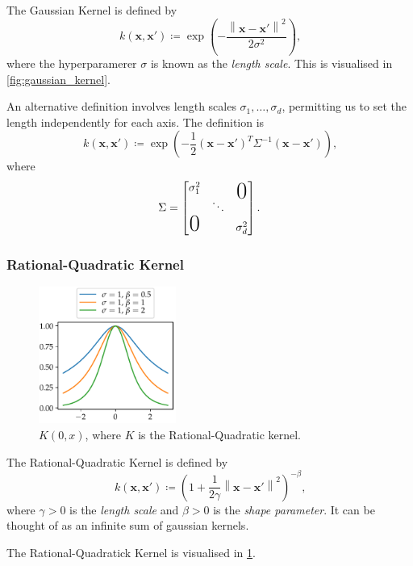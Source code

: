 \documentclass[11pt,twoside]{report}
\newcommand\bx{\mathbf{x}}
\newcommand\norm[1]{\left\|#1\right\|}
\begin{document}
The Gaussian Kernel is defined by \[
    k(\bx, \bx') \coloneqq \exp\left( - \frac{\norm{\bx - \bx'}^2}{2\sigma^2} \right) \text{,}
\] where the hyperparamerer $\sigma$ is known as the \textit{length scale}. This is visualised in \cref{fig:gaussian_kernel}.

An alternative definition involves length scales $\sigma_1, \dots, \sigma_d$, permitting us to set the length independently for each axis. The definition is \[
    k(\bx, \bx') \coloneqq \exp\left( - \frac{1}{2}\left(\bx - \bx'\right)^T\Sigma^{-1}\left(\bx - \bx'\right) \right) \text{,}
\] where \[
    \Sigma = \begin{bmatrix}
        \sigma_1^2 & & \makebox(0,0){\text{\huge0}} \\
        & \ddots & \\
        \mbox{\huge 0} & & \sigma_d^2
    \end{bmatrix} \text{.}
\]

\subsubsection{Rational-Quadratic Kernel}

  \begin{figure}
    \centering
    \includegraphics[width=0.4\textwidth]{rational_quadratic_kernel_plot.pdf}
    \caption{$K(0, x)$, where $K$ is the Rational-Quadratic kernel.}
    \label{fig:rational_quadratic_kernel}
  \end{figure}

The Rational-Quadratic Kernel is defined by \[
    k(\bx, \bx') \coloneqq \left(1 + \frac{1}{2\gamma}\norm{\bx - \bx'}^2\right)^{-\beta} \text{,}
\] where $\gamma > 0$ is the \textit{length scale} and $\beta > 0$ is the \textit{shape parameter}. It can be thought of as an infinite sum of gaussian kernels.

The Rational-Quadratick Kernel is visualised in \cref{fig:rational_quadratic_kernel}.
\end{document}
